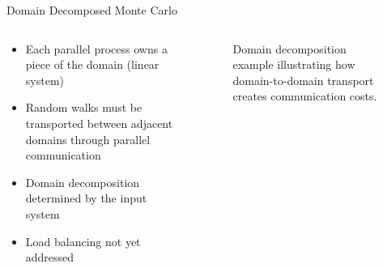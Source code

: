 \documentclass{beamer}
\begin{document}
\begin{frame}{Domain Decomposed Monte Carlo}

  \begin{columns}
    \begin{column}{0.5\textwidth}
      \begin{itemize}
      \item Each parallel process owns a piece of the domain (linear
        system)
        \bigskip
      \item Random walks must be transported between adjacent domains
        through parallel communication
        \bigskip
      \item Domain decomposition determined by the input system
        \bigskip
      \item Load balancing not yet addressed
      \end{itemize}
    \end{column}

    \begin{column}{0.5\textwidth}
      \begin{figure}[htpb!]
        \begin{center}
          \scalebox{0.75}{  }
        \end{center}
        \caption{\small Domain decomposition example illustrating
          how domain-to-domain transport creates communication costs.}
      \end{figure}
    \end{column}
  \end{columns}

\end{frame}
\end{document}
